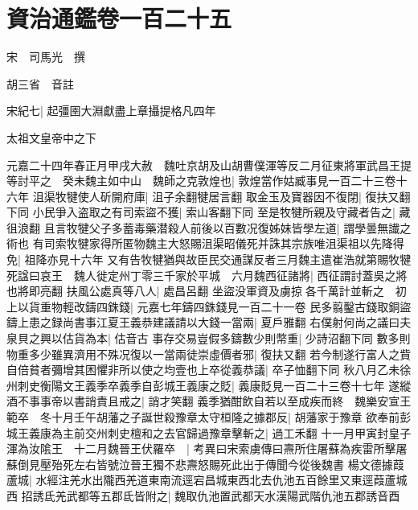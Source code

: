 \section{資治通鑑卷一百二十五}
宋　司馬光　撰

胡三省　音註

宋紀七|{
	起彊圉大淵獻盡上章攝提格凡四年}


太祖文皇帝中之下

元嘉二十四年春正月甲戌大赦　魏吐京胡及山胡曹僕渾等反二月征東將軍武昌王提等討平之　癸未魏主如中山　魏師之克敦煌也|{
	敦煌當作姑臧事見一百二十三卷十六年}
沮渠牧犍使人斫開府庫|{
	沮子余翻犍居言翻}
取金玉及寶器因不復閉|{
	復扶又翻下同}
小民爭入盗取之有司索盜不獲|{
	索山客翻下同}
至是牧犍所親及守藏者告之|{
	藏徂浪翻}
且言牧犍父子多蓄毒藥潜殺人前後以百數况復姊妹皆學左道|{
	謂學曇無䜟之術也}
有司索牧犍家得所匿物魏主大怒賜沮渠昭儀死并誅其宗族唯沮渠祖以先降得免|{
	祖降亦見十六年}
又有告牧犍猶與故臣民交通謀反者三月魏主遣崔浩就第賜牧犍死諡曰哀王　魏人徙定州丁零三千家於平城　六月魏西征諸將|{
	西征謂討蓋吳之將也將即亮翻}
扶風公處真等八人|{
	處昌呂翻}
坐盜没軍資及虜掠各千萬計並斬之　初上以貨重物輕改鑄四銖錢|{
	元嘉七年鑄四銖錢見一百二十一卷}
民多翦鑿古錢取銅盜鑄上患之録尚書事江夏王義恭建議請以大錢一當兩|{
	夏戶雅翻}
右僕射何尚之議曰夫泉貝之興以估貨為本|{
	估音古}
事存交易豈假多鑄數少則幣重|{
	少詩沼翻下同}
數多則物重多少雖異濟用不殊况復以一當兩徒崇虛價者邪|{
	復扶又翻}
若今制遂行富人之貲自倍貧者彌增其困懼非所以使之均壹也上卒從義恭議|{
	卒子恤翻下同}
秋八月乙未徐州刺史衡陽文王義季卒義季自彭城王義康之貶|{
	義康貶見一百二十三卷十七年}
遂縱酒不事事帝以書誚責且戒之|{
	誚才笑翻}
義季猶酣飲自若以至成疾而終　魏樂安宣王範卒　冬十月壬午胡藩之子誕世殺豫章太守桓隆之據郡反|{
	胡藩家于豫章}
欲奉前彭城王義康為主前交州刺史檀和之去官歸過豫章擊斬之|{
	過工禾翻}
十一月甲寅封皇子渾為汝隂王　十二月魏晉王伏羅卒　|{
	考異曰宋索虜傳曰燾所住屠蘇為疾雷所擊屠蘇倒見壓殆死左右皆號泣晉王獨不悲燾怒賜死此出于傳聞今從後魏書}
楊文德據葭蘆城|{
	水經注羌水出隴西羌道東南流逕宕昌城東西北去仇池五百餘里又東逕葭蘆城西}
招誘氐羌武都等五郡氐皆附之|{
	魏取仇池置武都天水漢陽武階仇池五郡誘音酉}


